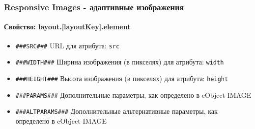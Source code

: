 
\begin{frame}[fragile]
	\frametitle{Responsive Images - адаптивные изображения}
	\framesubtitle{Свойство: layout.[layoutKey].element}


	\begin{itemize}
			\item \lstinline!###SRC###!\newline
				URL для атрибута: \texttt{src}

			\item \lstinline!###WIDTH###!\newline
				Ширина изображения (в пикселях) для атрибута: \texttt{width}

			\item \lstinline!###HEIGHT###!\newline
				Высота изображения (в пикселях) для атрибута: \texttt{height}

			\item \lstinline!###PARAMS###!\newline
				Дополнительные параметры, как определено в cObject IMAGE

			\item \lstinline!###ALTPARAMS###!\newline
				Дополнительные альтернативные параметры, как определено в cObject IMAGE

	\end{itemize}

\end{frame}


